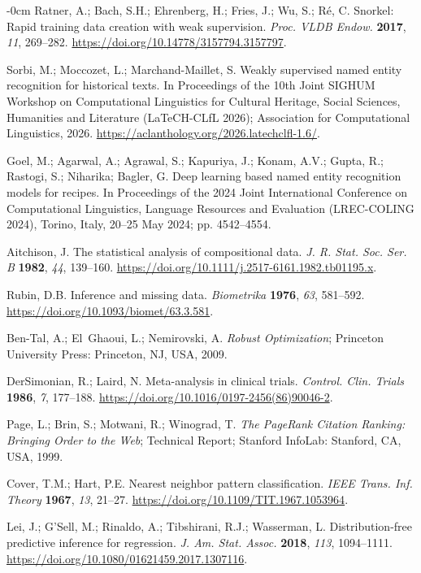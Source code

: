 \documentclass[10pt,a4paper]{article}
\newlength{\extralength}\setlength{\extralength}{3.7cm}
\renewenvironment{thebibliography}[1]{\nolinenumbers\small\list{\arabic{enumiv}.}{\settowidth\labelwidth{999.}\leftmargin\labelwidth\advance\leftmargin\labelsep\usecounter{enumiv}\itemsep 0pt}\sloppy}{\endlist}
\begin{document}
\begin{adjustwidth}{-\extralength}{0cm}
\begin{thebibliography}{999}
 Ratner, A.; Bach, S.H.; Ehrenberg, H.; Fries, J.; Wu, S.; R\'{e}, C. Snorkel: Rapid training data creation with weak supervision. \emph{Proc. VLDB Endow.} \textbf{2017}, \emph{11}, 269--282. \url{https://doi.org/10.14778/3157794.3157797}.

 Sorbi, M.; Moccozet, L.; Marchand-Maillet, S. Weakly supervised named entity recognition for historical texts. In Proceedings of the 10th Joint SIGHUM Workshop on Computational Linguistics for Cultural Heritage, Social Sciences, Humanities and Literature (LaTeCH-CLfL 2026); Association for Computational Linguistics, 2026. \url{https://aclanthology.org/2026.latechclfl-1.6/}.

 Goel, M.; Agarwal, A.; Agrawal, S.; Kapuriya, J.; Konam, A.V.; Gupta, R.; Rastogi, S.; Niharika; Bagler, G. Deep learning based named entity recognition models for recipes. In Proceedings of the 2024 Joint International Conference on Computational Linguistics, Language Resources and Evaluation (LREC-COLING 2024), Torino, Italy, 20--25 May 2024; pp. 4542--4554.

 Aitchison, J. The statistical analysis of compositional data. \emph{J. R. Stat. Soc. Ser. B} \textbf{1982}, \emph{44}, 139--160. \url{https://doi.org/10.1111/j.2517-6161.1982.tb01195.x}.

 Rubin, D.B. Inference and missing data. \emph{Biometrika} \textbf{1976}, \emph{63}, 581--592. \url{https://doi.org/10.1093/biomet/63.3.581}.

 Ben-Tal, A.; El~Ghaoui, L.; Nemirovski, A. \emph{Robust Optimization}; Princeton University Press: Princeton, NJ, USA, 2009.

 DerSimonian, R.; Laird, N. Meta-analysis in clinical trials. \emph{Control. Clin. Trials} \textbf{1986}, \emph{7}, 177--188. \url{https://doi.org/10.1016/0197-2456(86)90046-2}.

 Page, L.; Brin, S.; Motwani, R.; Winograd, T. \emph{The PageRank Citation Ranking: Bringing Order to the Web}; Technical Report; Stanford InfoLab: Stanford, CA, USA, 1999.

 Cover, T.M.; Hart, P.E. Nearest neighbor pattern classification. \emph{IEEE Trans. Inf. Theory} \textbf{1967}, \emph{13}, 21--27. \url{https://doi.org/10.1109/TIT.1967.1053964}.

 Lei, J.; G'Sell, M.; Rinaldo, A.; Tibshirani, R.J.; Wasserman, L. Distribution-free predictive inference for regression. \emph{J. Am. Stat. Assoc.} \textbf{2018}, \emph{113}, 1094--1111. \url{https://doi.org/10.1080/01621459.2017.1307116}.


\end{thebibliography}
\end{adjustwidth}
\end{document}
